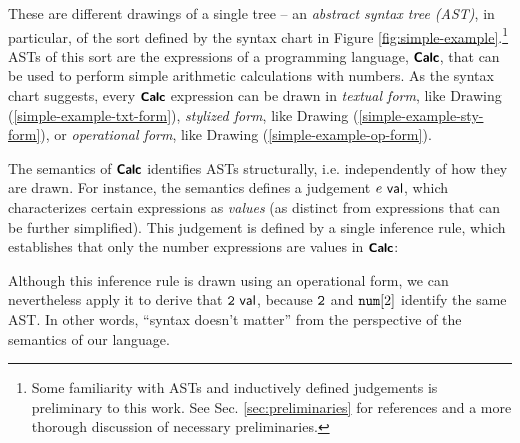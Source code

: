 \noindent
These are different drawings of a single tree -- an \emph{abstract syntax tree (AST)}, in particular, of the sort defined by the syntax chart in Figure \ref{fig:simple-example}.\footnote{Some familiarity with ASTs and inductively defined judgements is preliminary to this work. See Sec. \ref{sec:preliminaries} for references and a more thorough discussion of necessary preliminaries.} ASTs of this sort are the expressions of a programming language, $\simplelang$, that can be used to perform simple arithmetic calculations with numbers. 
As the syntax chart suggests, every $\simplelang$ expression can be drawn in \emph{textual form}, like Drawing (\ref{simple-example-txt-form}), \emph{stylized form}, like Drawing (\ref{simple-example-sty-form}), or \emph{operational form}, like Drawing (\ref{simple-example-op-form}).





 The semantics of $\simplelang$ identifies ASTs {structurally}, i.e. independently of how they are drawn. For instance, the semantics defines a judgement $\isvalU{e}$, which characterizes certain expressions as \emph{values} (as distinct from  expressions that can be further simplified). This judgement is defined by a single inference rule, which establishes that only the number expressions are values in $\simplelang$:
\begin{mathpar}
\end{mathpar}
Although this inference rule is drawn using an operational form, we can nevertheless apply it to derive that $\isvalU{\numintro{2}}$, because $\numintro{2}$ and $\anumintro{2}$ identify the same AST. In other words, ``syntax doesn't matter'' from the perspective of the semantics of our language.


